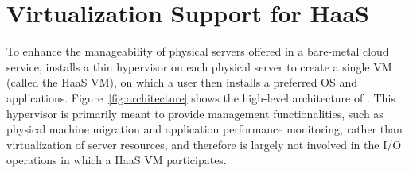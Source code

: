 \section{Virtualization Support for HaaS}



To enhance the manageability of physical servers offered in a bare-metal cloud service, \na installs 
a thin hypervisor on each physical server  to create a single VM (called the HaaS VM), on which 
a \na user then installs a preferred OS and applications. 
Figure~\ref{fig:architecture} shows the high-level architecture of \na.
This  hypervisor is primarily meant to provide management functionalities, such as 
physical machine migration and application performance monitoring, rather than virtualization 
of server resources, and therefore is largely not involved in the I/O operations in which a HaaS VM participates.

